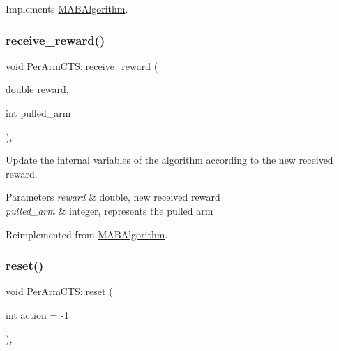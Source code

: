 Implements \mbox{\hyperlink{class_m_a_b_algorithm_afb48f01df0e1860d19759f6e20335007}{M\+A\+B\+Algorithm}}.

\mbox{\label{class_per_arm_c_t_s_af9ac7b45d329223ce506e977b96a32ee}} 
\subsubsection{\texorpdfstring{receive\+\_\+reward()}{receive\_reward()}}
{\footnotesize\ttfamily void Per\+Arm\+C\+T\+S\+::receive\+\_\+reward (\begin{DoxyParamCaption}\item[{double}]{reward,  }\item[{int}]{pulled\+\_\+arm }\end{DoxyParamCaption})\hspace{0.3cm}{\ttfamily [override]}, {\ttfamily [virtual]}}



Update the internal variables of the algorithm according to the new received reward. 


\begin{DoxyParams}{Parameters}
{\em reward} & double, new received reward \\
\hline
{\em pulled\+\_\+arm} & integer, represents the pulled arm \\
\hline
\end{DoxyParams}


Reimplemented from \mbox{\hyperlink{class_m_a_b_algorithm_aa584b3d6b86fa050e3389be9781b5782}{M\+A\+B\+Algorithm}}.

\mbox{\label{class_per_arm_c_t_s_ae5f8998bfb68b4a9cbdea7bca34f5cbe}} 
\subsubsection{\texorpdfstring{reset()}{reset()}}
{\footnotesize\ttfamily void Per\+Arm\+C\+T\+S\+::reset (\begin{DoxyParamCaption}\item[{int}]{action = {\ttfamily -\/1} }\end{DoxyParamCaption})\hspace{0.3cm}{\ttfamily [override]}, {\ttfamily [virtual]}}



